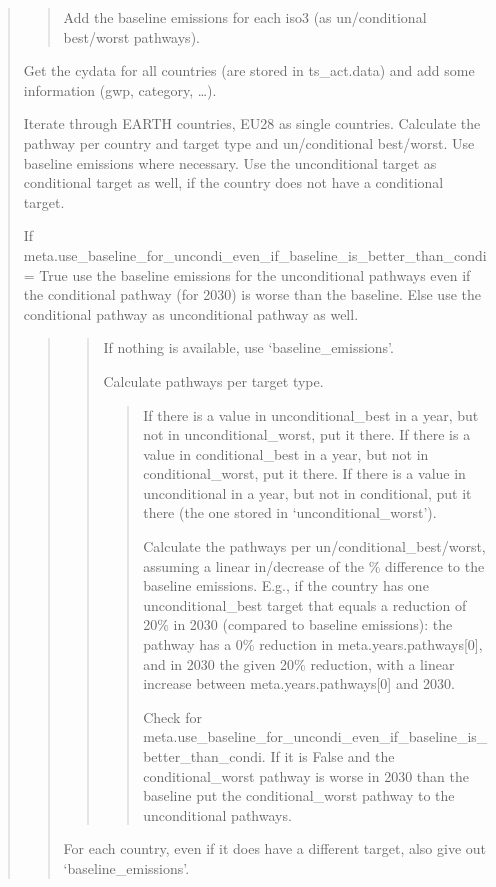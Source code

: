 \documentclass[letterpaper,10pt,english]{sphinxmanual}
\begin{document}
\begin{quote}
\begin{quote}

Add the baseline emissions for each iso3 (as un/conditional best/worst pathways).
\end{quote}

Get the cydata for all countries (are stored in ts\_act.data) and add some information (gwp, category, …).

Iterate through EARTH countries, EU28 as single countries.
Calculate the pathway per country and target type and un/conditional best/worst.
Use baseline emissions where necessary.
Use the unconditional target as conditional target as well, if the country does not have a conditional target.

If meta.use\_baseline\_for\_uncondi\_even\_if\_baseline\_is\_better\_than\_condi = True
use the baseline emissions for the unconditional pathways even if the conditional
pathway (for 2030) is worse than the baseline.
Else use the conditional pathway as unconditional pathway as well.
\begin{quote}
\begin{quote}

If nothing is available, use ‘baseline\_emissions’.

Calculate pathways per target type.
\begin{quote}

If there is a value in unconditional\_best in a year, but not in unconditional\_worst, put it there.
If there is a value in conditional\_best in a year, but not in conditional\_worst, put it there.
If there is a value in unconditional in a year, but not in conditional, put it there (the one
stored in ‘unconditional\_worst’).

Calculate the pathways per un/conditional\_best/worst, assuming a linear in/decrease of the
\% difference to the baseline emissions.
E.g., if the country has one unconditional\_best target that equals a reduction of 20\% in 2030
(compared to baseline emissions):
the pathway has a 0\% reduction in meta.years.pathways{[}0{]}, and in 2030 the given
20\% reduction, with a linear increase between meta.years.pathways{[}0{]} and 2030.

Check for meta.use\_baseline\_for\_uncondi\_even\_if\_baseline\_is\_better\_than\_condi.
If it is False and the conditional\_worst pathway is worse in 2030 than the baseline
put the conditional\_worst pathway to the unconditional pathways.
\end{quote}
\end{quote}

For each country, even if it does have a different target, also give out ‘baseline\_emissions’.
\end{quote}
\end{quote}
\end{document}

